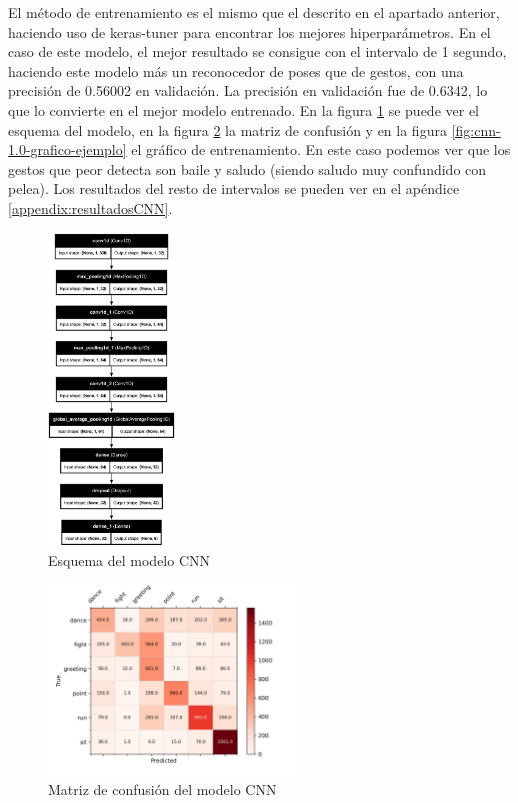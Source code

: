 El método de entrenamiento es el mismo que el descrito en el apartado anterior, haciendo uso de keras-tuner para encontrar los mejores hiperparámetros. En el caso de este modelo, el mejor resultado se consigue con el intervalo de 1 segundo, haciendo este modelo más un reconocedor de poses que de gestos, con una precisión de 0.56002 en validación. La precisión en validación fue de 0.6342, lo que lo convierte en el mejor modelo entrenado. En la figura \ref{fig:cnn-1.0-ejemplo} se puede ver el esquema del modelo, en la figura \ref{fig:cnn-1.0-matriz-ejemplo} la matriz de confusión y en la figura \ref{fig:cnn-1.0-grafico-ejemplo} el gráfico de entrenamiento. En este caso podemos ver que los gestos que peor detecta son baile y saludo (siendo saludo muy confundido con pelea). Los resultados del resto de intervalos se pueden ver en el apéndice \ref{appendix:resultadosCNN}.
\begin{figure}[H]
    \centering
    \includegraphics[width=0.3\textwidth]{Imagenes/Bitmap/best-cnn1.0.png}
    \caption{Esquema del modelo CNN}
    \label{fig:cnn-1.0-ejemplo}
\end{figure}

\begin{figure}[H]
    \centering
    \includegraphics[width=0.6\textwidth]{Imagenes/Bitmap/CM_best-cnn1.0.png}
    \caption{Matriz de confusión del modelo CNN}
    \label{fig:cnn-1.0-matriz-ejemplo}
\end{figure}

